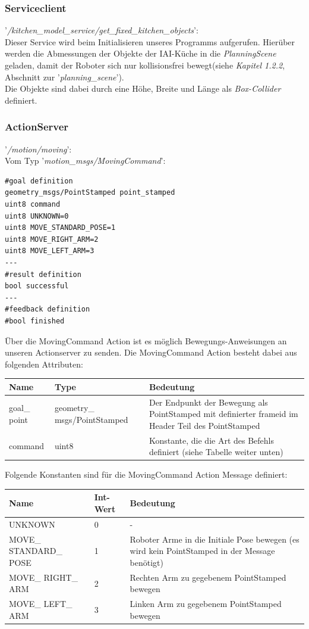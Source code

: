 \documentclass{suturo}
\begin{document}
\subsubsection{Serviceclient}
'\textit{/kitchen\_model\_service/get\_fixed\_kitchen\_objects}': \\
Dieser Service wird beim Initialisieren unseres Programms aufgerufen. Hierüber werden die Abmessungen der Objekte der IAI-Küche in die \textit{PlanningScene} geladen, damit der Roboter sich nur kollisionsfrei bewegt(siehe \textit{Kapitel 1.2.2}, Abschnitt zur '\textit{planning\_scene}').\\
Die Objekte sind dabei durch eine Höhe, Breite und Länge als \textit{Box-Collider} definiert.


\subsubsection{ActionServer}
'\textit{/motion/moving}': \\
Vom Typ '\textit{motion\_msgs/MovingCommand}': \\
\begin{lstlisting}
#goal definition
geometry_msgs/PointStamped point_stamped
uint8 command
uint8 UNKNOWN=0
uint8 MOVE_STANDARD_POSE=1
uint8 MOVE_RIGHT_ARM=2
uint8 MOVE_LEFT_ARM=3
---
#result definition
bool successful
---
#feedback definition
#bool finished
\end{lstlisting}
\newpage
Über die MovingCommand Action ist es möglich Bewegungs-Anweisungen an unseren Actionserver zu senden. Die MovingCommand Action besteht dabei aus folgenden Attributen:
\begin{center}
	\begin{tabular}{ l | l | p{7cm}}
		Name & Type & Bedeutung \\ \hline
		goal\_ point & geometry\_ msgs/PointStamped & Der Endpunkt der Bewegung als PointStamped mit definierter frameid im Header Teil des PointStamped \\ \hline
		command & uint8 & Konstante, die die Art des Befehls definiert (siehe Tabelle weiter unten) \\
	\end{tabular}
\end{center}

Folgende Konstanten sind für die MovingCommand Action Message definiert:

\begin{center}
	\begin{tabular}{ l | l | p{7cm}}
		Name & Int-Wert & Bedeutung \\ \hline
		UNKNOWN & 0 & - \\ \hline
		MOVE\_ STANDARD\_ POSE & 1 & Roboter Arme in die Initiale Pose bewegen (es wird kein PointStamped in der Message benötigt) \\ \hline
		MOVE\_ RIGHT\_ ARM & 2 & Rechten Arm zu gegebenem PointStamped bewegen \\ \hline
		MOVE\_ LEFT\_ ARM & 3 & Linken Arm zu gegebenem PointStamped bewegen \\
	\end{tabular}
\end{center}
\end{document}
